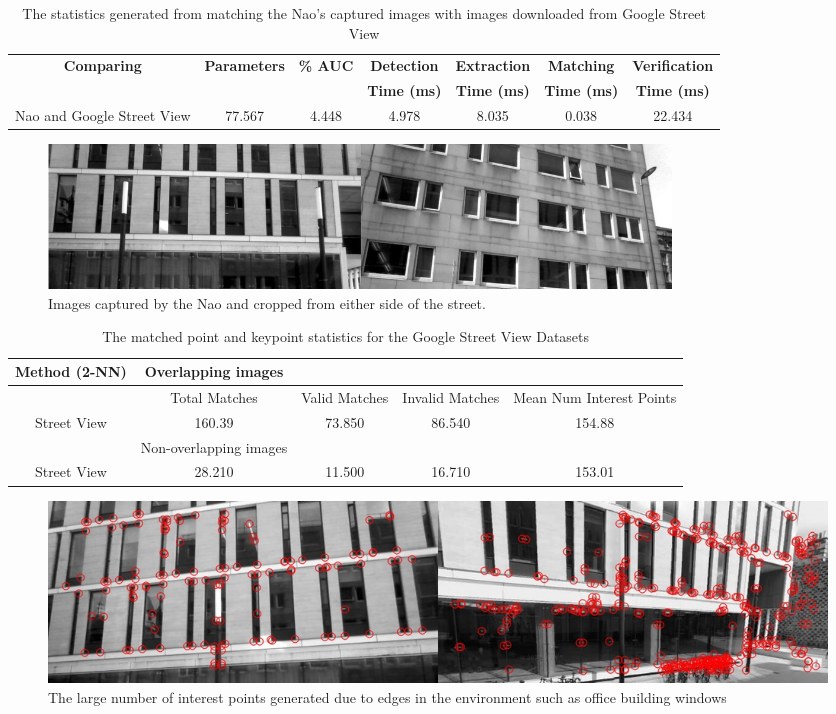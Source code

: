 \begin{table}
\centering
\caption{The statistics generated from matching the Nao's captured images with
images downloaded from Google Street View}
\footnotesize
\begin{tabular}{|c|c|c|c|c|c|c|}
\hline 
\textbf{Comparing} & \textbf{Parameters} & \textbf{\% AUC} & \textbf{Detection} & \textbf{Extraction} & \textbf{Matching} & \textbf{Verification}\tabularnewline
 &  &  & \textbf{Time (ms)} & \textbf{Time (ms)} & \textbf{Time (ms)} & \textbf{Time (ms)}\tabularnewline
\hline 
\hline 
Nao and Google Street View & 77.567 & 4.448 & 4.978 & 8.035 & 0.038 & 22.434\tabularnewline
\hline 
\end{tabular}
\label{tab:naoGoogleStreetRoc}
\end{table}

 \begin{figure}[h!] 
  \centering
    \includegraphics[width=0.8\textwidth]{../Drawings/streetView/similarGooglePics.jpg}
    \caption{Images captured by the Nao and cropped from either side of the street.}
    \label{fig:similarGoogleStreetView}
\end{figure}

\begin{table}
\centering
\caption{The matched point and keypoint statistics for the Google Street View
Datasets}
\begin{tabular}{|c|c|c|c|c|}
\hline 
Method (2-NN) & Overlapping images &  &  & \tabularnewline
\hline 
\hline 
 & Total Matches & Valid Matches & Invalid Matches & Mean Num Interest Points\tabularnewline
\hline 
Street View  & 160.39 & 73.850 & 86.540 & 154.88\tabularnewline
\hline 
 & Non-overlapping images &  &  & \tabularnewline
\hline 
Street View & 28.210 & 11.500 & 16.710 & 153.01\tabularnewline
\hline 
\end{tabular}
\label{tab:google_matches_keypoints}
\end{table}


 \begin{figure}[h!] 
  \centering
    \includegraphics[width=1.0\textwidth]{../Drawings/Matching/google_street_interest_points.jpg}
    \caption{The large number of interest points generated due to edges in the environment such as office building windows}
    \label{fig:google_interest_points}
\end{figure}


